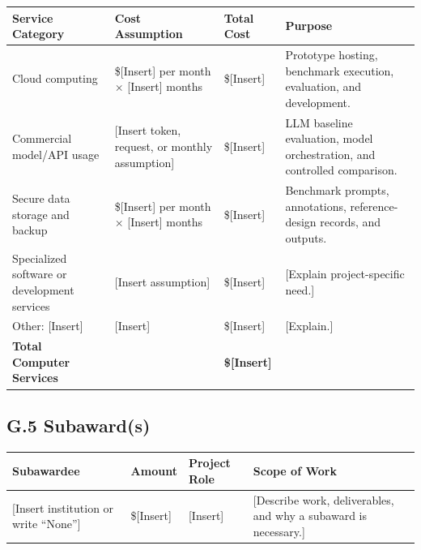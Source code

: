 \documentclass[11pt,letterpaper]{article}
\begin{document}
\begin{table}[htbp]
\centering
\renewcommand{\arraystretch}{1.25}
\begin{tabularx}{\textwidth}{
    p{}
    p{}
    p{}
    X
}
\toprule
\textbf{Service Category} &
\textbf{Cost Assumption} &
\textbf{Total Cost} &
\textbf{Purpose} \\
\midrule

Cloud computing &
\$[Insert] per month $\times$ [Insert] months &
\$[Insert] &
Prototype hosting, benchmark execution, evaluation, and development. \\

Commercial model/API usage &
[Insert token, request, or monthly assumption] &
\$[Insert] &
LLM baseline evaluation, model orchestration, and controlled comparison. \\

Secure data storage and backup &
\$[Insert] per month $\times$ [Insert] months &
\$[Insert] &
Benchmark prompts, annotations, reference-design records, and outputs. \\

Specialized software or development services &
[Insert assumption] &
\$[Insert] &
[Explain project-specific need.] \\

Other: [Insert] &
[Insert] &
\$[Insert] &
[Explain.] \\

\midrule
\textbf{Total Computer Services} &
&
\textbf{\$[Insert]} &
\\
\bottomrule
\end{tabularx}
\end{table}

\subsection*{G.5 Subaward(s)}

\begin{table}[htbp]
\centering
\renewcommand{\arraystretch}{1.25}
\begin{tabularx}{\textwidth}{
    p{}
    p{}
    p{}
    X
}
\toprule
\textbf{Subawardee} &
\textbf{Amount} &
\textbf{Project Role} &
\textbf{Scope of Work} \\
\midrule

[Insert institution or write ``None''] &
\$[Insert] &
[Insert] &
[Describe work, deliverables, and why a subaward is necessary.] \\

\bottomrule
\end{tabularx}
\end{table}
\end{document}
